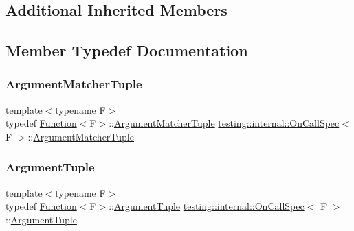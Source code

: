 \subsection*{Additional Inherited Members}


\subsection{Member Typedef Documentation}
\mbox{\label{classtesting_1_1internal_1_1_on_call_spec_a3240f159f0a9d8cda208bc256da35074}} 
\subsubsection{\texorpdfstring{Argument\+Matcher\+Tuple}{ArgumentMatcherTuple}}
{\footnotesize\ttfamily template$<$typename F$>$ \\
typedef \hyperlink{structtesting_1_1internal_1_1_function}{Function}$<$F$>$\+::\hyperlink{classtesting_1_1internal_1_1_on_call_spec_a3240f159f0a9d8cda208bc256da35074}{Argument\+Matcher\+Tuple} \hyperlink{classtesting_1_1internal_1_1_on_call_spec}{testing\+::internal\+::\+On\+Call\+Spec}$<$ F $>$\+::\hyperlink{classtesting_1_1internal_1_1_on_call_spec_a3240f159f0a9d8cda208bc256da35074}{Argument\+Matcher\+Tuple}}

\mbox{\label{classtesting_1_1internal_1_1_on_call_spec_a70ffab8b915b7b48a90f5ce256da806f}} 
\subsubsection{\texorpdfstring{Argument\+Tuple}{ArgumentTuple}}
{\footnotesize\ttfamily template$<$typename F$>$ \\
typedef \hyperlink{structtesting_1_1internal_1_1_function}{Function}$<$F$>$\+::\hyperlink{classtesting_1_1internal_1_1_on_call_spec_a70ffab8b915b7b48a90f5ce256da806f}{Argument\+Tuple} \hyperlink{classtesting_1_1internal_1_1_on_call_spec}{testing\+::internal\+::\+On\+Call\+Spec}$<$ F $>$\+::\hyperlink{classtesting_1_1internal_1_1_on_call_spec_a70ffab8b915b7b48a90f5ce256da806f}{Argument\+Tuple}}




